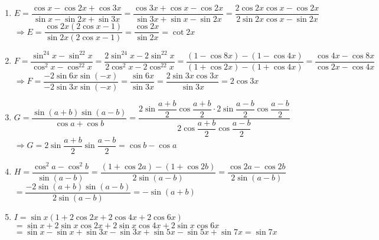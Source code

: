 \begin{bt}
{\begin{enumerate}
			$ \Rightarrow D=\dfrac{\sin 4x\left(2\cos 3x+1\right)}{\cos 4x\left(2\cos 3x+1\right)}=\dfrac{\sin 4x}{\cos 4x}=\tan 4x$
			\item $E=\dfrac{\cos x-\cos 2x+\cos 3x}{\sin x-\sin 2x+\sin 3x}=\dfrac{\cos 3x+\cos x-\cos 2x}{\sin 3x+\sin x-\sin 2x}=\dfrac{2\cos 2x\cos x-\cos 2x}{2\sin 2x\cos x-\sin 2x}$\\
			$ \Rightarrow E=\dfrac{\cos 2x\left(2\cos x-1\right)}{\sin 2x\left(2\cos x-1\right)}=\dfrac{\cos 2x}{\sin 2x}=\cot 2x$
			\item $F=\dfrac{\sin^24x-\sin^22x}{\cos^2x-\cos^22x}=\dfrac{2\sin^24x-2\sin^22x}{2\cos^2x-2\cos^22x}=\dfrac{\left(1-\cos 8x\right)-\left(1-\cos 4x\right)}{\left(1+\cos 2x\right)-\left(1+\cos 4x\right)}=\dfrac{\cos 4x-\cos 8x}{\cos 2x-\cos 4x}$
			$ \Rightarrow F=\dfrac{-2\sin 6x\sin (-x)}{-2\sin 3x\sin (-x)}=\dfrac{\sin 6x}{\sin 3x}=\dfrac{2\sin 3x\cos 3x}{\sin 3x}=2\cos 3x$
			\item $G=\dfrac{\sin (a+b)\sin (a-b)}{\cos a+\cos b}=\dfrac{2\sin \dfrac{a+b}{2} \cos \dfrac{a+b}{2}\cdot 2\sin \dfrac{a-b}{2} \cos \dfrac{a-b}{2}}{2\cos \dfrac{a+b}{2} \cos \dfrac{a-b}{2}}$ \\
			$ \Rightarrow G=2\sin \dfrac{a+b}{2} \sin \dfrac{a-b}{2}=\cos b-\cos a$
			\item $H=\dfrac{\cos^2a-\cos^2b}{\sin (a-b)}=\dfrac{\left(1+\cos 2a\right)-\left(1+\cos 2b\right)}{2\sin (a-b)}=\dfrac{\cos 2a-\cos 2b}{2\sin (a-b)}$\\
			$=\dfrac{-2\sin (a+b)\sin (a-b)}{2\sin (a-b)}=-\sin (a+b)$
			\item $I=\sin x\left(1+2\cos 2x+2\cos 4x+2\cos 6x\right)$ \\
			$=\sin x+2\sin x\cos 2x+2\sin x\cos 4x+2\sin x\cos 6x$ \\
			$=\sin x-\sin x+\sin 3x-\sin 3x+\sin 5x-\sin 5x+\sin 7x=\sin 7x$
			
		\end{enumerate}
	}
\end{bt}



